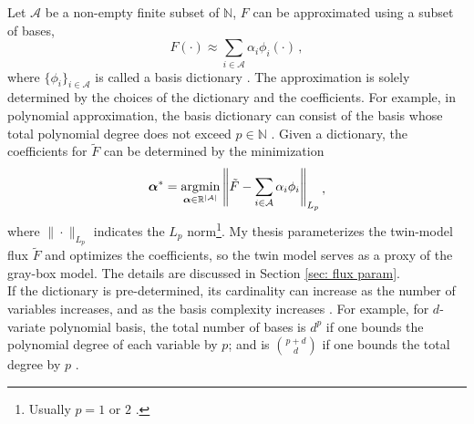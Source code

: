 Let $\mathcal{A}$ be a non-empty finite subset of $\mathbb{N}$,
$F$ can be approximated using a subset of bases, 
\begin{equation}
    F(\cdot) \approx \sum_{i\in \mathcal{A}} {\alpha_i} \phi_i(\cdot)\,,
    \label{eqn: linear param truncate}
\end{equation}
where $\{\phi_i\}_{i\in \mathcal{A}}$ is called a basis dictionary \cite{match pursuit}. 
The approximation is solely determined by the choices of the dictionary and the coefficients.
For example, in polynomial approximation, the basis dictionary can consist of
the basis whose total polynomial degree does not exceed $p\in \mathbb{N}$ \cite{PCE}.
Given a dictionary, the coefficients for $\tilde{F}$
can be determined by the minimization \cite{PCE}
\begin{equation}\begin{split}
    \boldsymbol{\alpha}^* = \operatorname*{\arg\!\min}_{\boldsymbol{\alpha}\in \mathbb{R}^{|\mathcal{A}|}}
    \left\| \tilde{F}-\sum_{i\in \mathcal{A}} \alpha_i \phi_i \right\|_{L_p}
\end{split}\,,
\label{eqn: least squares demo}
\end{equation}
where $\|\cdot\|_{L_p}$ indicates the $L_p$ norm\footnote{
    Usually $p=1$ \cite{L1 basis pursuit} or $2$ \cite{L2 frame, match pursuit}.
}.
My thesis parameterizes the twin-model flux $\tilde{F}$ and
optimizes the coefficients,
so the twin model serves as a proxy of the gray-box model. The details are discussed in 
Section \ref{sec: flux param}.\\

If the dictionary is pre-determined,
its cardinality can increase as the number of variables increases, and
as the basis complexity increases \cite{PCE}.
For example, for $d$-variate polynomial basis, the total number of bases 
is $d^p$ if one bounds the polynomial degree of each variable by $p$; and 
is $\binom{p+d}{d}$ if one bounds the total degree by $p$ \cite{PCE}.\\


